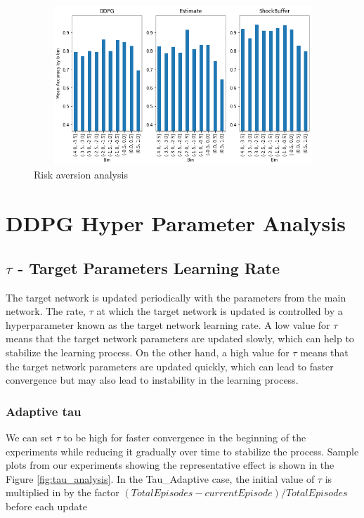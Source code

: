\begin{figure}[htpb]
    \includegraphics[width=1\textwidth,height=6cm]{figures/Results/bA.png}
  \caption[B Analysis]{Risk aversion analysis } \label{fig:results:bA}
\end{figure}



\section{DDPG Hyper Parameter Analysis}
\subsection{$\tau$ - Target Parameters Learning Rate}
The target network is updated periodically with the parameters from the main network. The rate, $\tau$ at which the target network is updated is controlled by a hyperparameter known as the target network learning rate. A low value for $\tau$ means that the target network parameters are updated slowly, which can help to stabilize the learning process. On the other hand, a high value for $\tau$ means that the target network parameters are updated quickly, which can lead to faster convergence but may also lead to instability in the learning process.  

\subsubsection{Adaptive tau}
 We can set $\tau$ to be high for faster convergence in the beginning of the experiments while reducing it gradually over time to stabilize the process. Sample plots from our experiments showing the representative effect is shown in the 
Figure \ref{fig:tau_analysis}. In the Tau\_Adaptive case, the initial value of $\tau$ is multiplied in  by the factor $(TotalEpisodes-currentEpisode)/TotalEpisodes$ before each update

